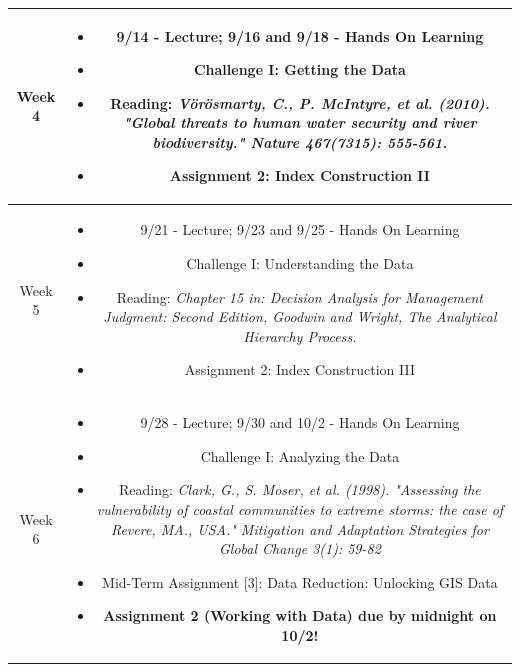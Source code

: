 \documentclass[11pt]{article}
\begin{document}
\begin{table}[h!]
\begin{tabular}{ | c | c | }
Week 4 & \begin{minipage}{.85\textwidth}
\begin{itemize} \itemsep-0.4em
	\vspace{1mm}
	\item 9/14 - Lecture; 9/16 and 9/18 - Hands On Learning
	\item Challenge I: Getting the Data  \item Reading: \textit{Vörösmarty, C., P. McIntyre, et al. (2010). "Global threats to human water security and river biodiversity." Nature 467(7315): 555-561.}
	\item Assignment 2: Index Construction II
	\vspace{1mm}
\end{itemize}
\end{minipage} \\
\hline

Week 5 & \begin{minipage}{.85\textwidth}
\begin{itemize} \itemsep-0.4em
	\vspace{1mm}
	\item 9/21 - Lecture; 9/23 and 9/25 - Hands On Learning
	\item Challenge I: Understanding the Data \item Reading: \textit{Chapter 15 in: Decision Analysis for Management Judgment: Second Edition, Goodwin and Wright, The Analytical Hierarchy Process.}
	\item Assignment 2: Index Construction III
	\vspace{1mm}
\end{itemize}
\end{minipage} \\
\hline


Week 6 & \begin{minipage}{.85\textwidth}
\begin{itemize} \itemsep-0.4em
	\vspace{1mm}
	\item 9/28 - Lecture; 9/30 and 10/2 - Hands On Learning
	\item Challenge I: Analyzing the Data 
	\item Reading: \textit{Clark, G., S. Moser, et al. (1998). "Assessing the vulnerability of coastal communities to extreme  storms: the case of Revere, MA., USA." Mitigation and Adaptation 
Strategies for Global Change 3(1): 59-82}
	\item Mid-Term Assignment [3]: Data Reduction: Unlocking GIS Data
	\item \textbf{Assignment 2 (Working with Data) due by midnight on 10/2!}
	\vspace{1mm}
\end{itemize}
\end{minipage} \\
\hline


\end{tabular}
\end{table}
\end{document}
